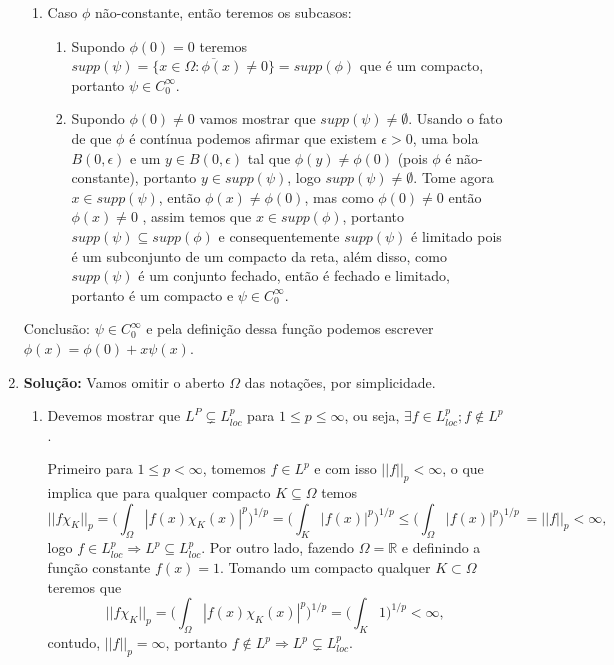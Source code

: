 \documentclass{article}
\begin{document}
\begin{enumerate}
\begin{enumerate}
			\item Caso $\phi$ não-constante, então teremos os subcasos:
				\begin{enumerate}
					\item Supondo $\phi(0) = 0$ teremos $supp(\psi) = \overline{ \{x \in \Omega: \phi(x) \neq 0\} } = supp(\phi)$ que é um compacto, portanto $\psi \in C^{\infty}_{0}$.
					
					\item Supondo $\phi(0) \neq 0$ vamos mostrar que $supp(\psi) \neq \emptyset$. Usando o fato de que $\phi$ é contínua podemos afirmar que existem $\epsilon > 0$, uma bola $B(0, \epsilon)$ e um $y \in B(0, \epsilon)$ tal que $\phi(y) \neq \phi(0)$ (pois $\phi$ é não-constante), portanto $y \in supp(\psi)$, logo $supp(\psi) \neq \emptyset$. Tome agora $x \in supp(\psi)$, então $\phi(x) \neq \phi(0)$, mas como $\phi(0) \neq 0$ então $\phi(x) \neq 0$ , assim temos que $x \in supp(\phi)$, portanto $supp(\psi) \subseteq supp(\phi)$ e consequentemente $supp(\psi)$ é limitado pois é um subconjunto de um compacto da reta, além disso, como $supp(\psi)$ é um conjunto fechado, então é fechado e limitado, portanto é um compacto e $\psi \in C^{\infty}_{0}$.
				\end{enumerate}
		\end{enumerate}
		
		Conclusão: $\psi \in C^{\infty}_{0}$ e pela definição dessa função podemos escrever $\phi(x) = \phi(0) + x \psi(x)$.
		
		\item \textbf{Solução:} Vamos omitir o aberto $\Omega$ das notações, por simplicidade.
		\begin{enumerate}
			\item Devemos mostrar que $L^{P} \subsetneq L^{p}_{loc}$ para $1 \leq p \leq \infty$, ou seja, $\exists f \in L^{p}_{loc}; f \notin L^{p}$. 
			
			Primeiro para $1 \leq p < \infty$, tomemos $f \in L^{p}$ e com isso $||f||_{p} < \infty$, o que implica que para qualquer compacto $K \subseteq \Omega$ temos 
			$$
			||f\chi_{K}||_{p} = \Big( \int_{\Omega}|f(x)\chi_{K} (x)|^{p} \Big)^{1/p}= \Big( \int_{K}|f(x)|^{p} \Big)^{1/p} \leq \Big( \int_{\Omega}|f(x)|^{p} \Big)^{1/p} \ = ||f||_{p} < \infty,
			$$
			logo $f \in L^{p}_{loc} \Rightarrow L^{p} \subseteq L^{p}_{loc}$. Por outro lado, fazendo $\Omega = \mathbb{R}$ e definindo a função constante $f(x) = 1$. Tomando um compacto qualquer $K \subset \Omega$ teremos que 
			$$
			||f \chi_{K}||_{p} = \Big( \int_{\Omega} |f(x)\chi_{K}(x)|^{p} \Big)^{1/p} = \Big( \int_{K} 1 \Big)^{1/p} < \infty,
			$$
			contudo, 
			$||f||_{p} = \infty$, portanto $f \notin L^{p} \Rightarrow L^{p} \subsetneq L^{p}_{loc}$.
			

\end{enumerate}
\end{enumerate}
\end{document}
